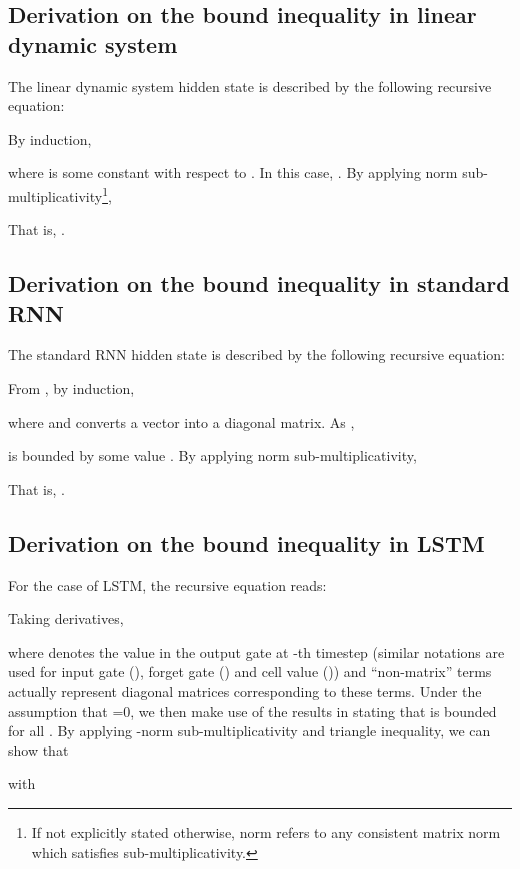 
\subsection{Derivation on the bound inequality in linear dynamic system\label{subsec:Derivation-on-theRNN}}

The linear dynamic system hidden state is described by the following
recursive equation:


By induction,


where  is some constant with respect to . In this case,
. By applying norm
sub-multiplicativity\footnote{If not explicitly stated otherwise, norm refers to any consistent
matrix norm which satisfies sub-multiplicativity. }, 


That is, .

\subsection{Derivation on the bound inequality in standard RNN\label{subsec:Derivation-on-theRNN-1}}

The standard RNN hidden state is described by the following recursive
equation:


From ,
by induction, 


where  and  converts
a vector into a diagonal matrix. As ,

is bounded by some value . By applying norm sub-multiplicativity, 


That is, .

\subsection{Derivation on the bound inequality in LSTM\label{subsec:Derivation-on-theLSTM}}

For the case of LSTM, the recursive equation reads:


Taking derivatives,


where  denotes the value in the output gate at -th timestep
(similar notations are used for input gate (), forget gate
() and cell value ()) and ``non-matrix'' terms actually
represent diagonal matrices corresponding to these terms. Under the
assumption that =0, we then make use of the results in \cite{miller2018recurrent}
stating that  is bounded for
all . By applying -norm sub-multiplicativity and
triangle inequality, we can show that



with




